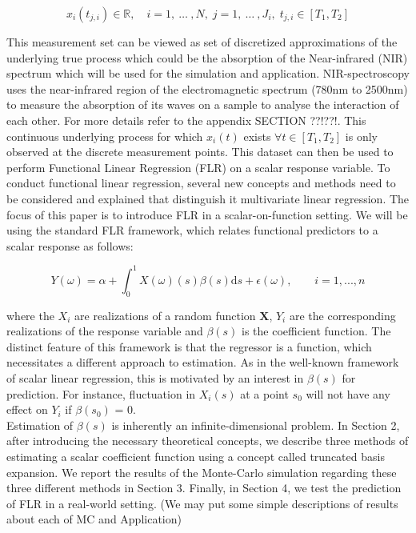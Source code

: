\documentclass[11pt,twoside,a4paper]{article}
\begin{document}
\begin{equation}
	x_{i}(t_{j,i}) \in \mathbb{R}, \quad i = 1,\: \dots\: ,N, \; j = 1, \: \dots \:, J_i, \; t_{j,i} \in [T_1, T_2]
\end{equation}
		
			 This measurement set can be viewed as set of discretized approximations of the underlying true process which could be the absorption of the Near-infrared (NIR) spectrum which will be used for the simulation and application. NIR-spectroscopy uses the near-infrared region of the electromagnetic spectrum (780nm to 2500nm) to measure the absorption of its waves on a sample to analyse the interaction of each other. {\color{green} For more details refer to the appendix SECTION ??!??!}. This continuous underlying process for which 
 $x_i(t)$ exists $\forall t \in [T_1, T_2]$ is only observed at the discrete measurement points. This dataset can then be used to perform Functional Linear Regression (FLR) on a scalar response variable. To conduct functional linear regression, several new concepts and methods need to be considered and explained that distinguish it multivariate linear regression.
The focus of this paper is to introduce FLR in a scalar-on-function setting. We will be using the standard FLR framework, which relates functional predictors to a scalar response as follows:
	 
	 \begin{equation}
	 	Y(\omega) = \alpha + \int_{0}^{1}{X(\omega)(s)\beta(s) \mathrm{d}s} + \epsilon(\omega),
	 	\qquad i = 1, ..., n
	 \end{equation}
 
	 where the $X_{i}$ are realizations of a random function $\mathbf{X}$, $Y_i$ are the corresponding realizations of the response variable and $\beta(s)$ is the coefficient function. The distinct feature of this framework is that the regressor is a function, which necessitates a different approach to estimation. As in the well-known framework of scalar linear regression, this is motivated by an interest in $\beta(s)$ for prediction. For instance, fluctuation in $X_i(s)$ at a point $s_0$ will not have any effect on $Y_i$ if $\beta(s_0)$ = 0. \\
	 Estimation of $\beta(s)$ is inherently an infinite-dimensional problem. In Section 2, after introducing the necessary theoretical concepts, we describe three methods of estimating a scalar coefficient function using a concept called truncated basis expansion. We report the results of the Monte-Carlo simulation regarding these three different methods in Section 3. Finally, in Section 4, we test the prediction of FLR in a real-world setting. {\color{red} (We may put some simple descriptions of results about each of MC and Application)}
\end{document}
